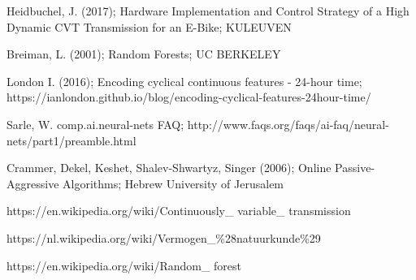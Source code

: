 \begin{thebibliography}{9}
Heidbuchel, J. (2017); Hardware Implementation and Control Strategy of a High Dynamic CVT Transmission for an E-Bike; KULEUVEN
 
Breiman, L. (2001); Random Forests; UC BERKELEY

London I. (2016); Encoding cyclical continuous features - 24-hour time; https://ianlondon.github.io/blog/encoding-cyclical-features-24hour-time/

Sarle, W. comp.ai.neural-nets FAQ; http://www.faqs.org/faqs/ai-faq/neural-nets/part1/preamble.html

Crammer, Dekel, Keshet, Shalev-Shwartyz, Singer (2006); Online Passive-Aggressive Algorithms; Hebrew University of Jerusalem

https://en.wikipedia.org/wiki/Continuously\_ variable\_ transmission

https://nl.wikipedia.org/wiki/Vermogen\_\%28natuurkunde\%29

https://en.wikipedia.org/wiki/Random\_ forest

\end{thebibliography}
